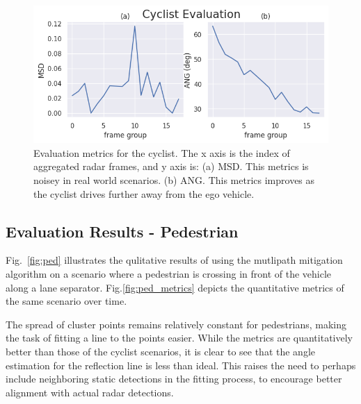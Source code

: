 \documentclass[../main.tex]{subfiles}
\begin{document}
\begin{figure}[htbp]
    \centerline{\includegraphics[scale=0.33]{figures/fig_cyclist_metrics.png}}
    \caption{Evaluation metrics for the cyclist. The x axis is the index of aggregated radar frames, and y axis is: (a) MSD. This metrics is noisey in real world scenarios. (b) ANG. This metrics improves as the cyclist drives further away from the ego vehicle.}
    \label{fig:cyclist_metrics}
\end{figure}



\subsection{Evaluation Results - Pedestrian}
Fig.~\ref{fig:ped} illustrates the qulitative results of using the mutlipath mitigation algorithm on a scenario where a pedestrian is crossing in front of the vehicle along a lane separator. Fig.\ref*{fig:ped_metrics} depicts the quantitative metrics of the same scenario over time. \\

\par
The spread of cluster points remains relatively constant for pedestrians, making the task of fitting a line to the points easier. While the metrics are quantitatively better than those of the cyclist scenarios, it is clear to see that the angle estimation for the reflection line is less than ideal. This raises the need to perhaps include neighboring static detections in the fitting process, to encourage better alignment with actual radar detections.
\end{document}
